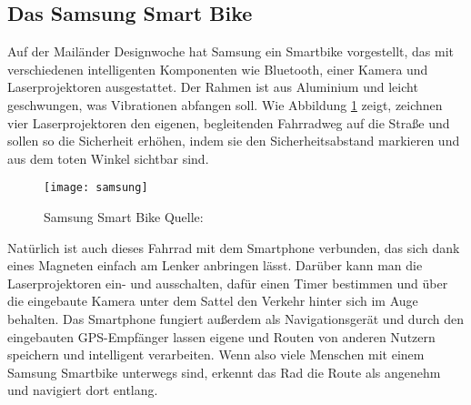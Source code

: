 \subsection{Das Samsung Smart Bike}
Auf der Mailänder Designwoche hat Samsung ein Smartbike vorgestellt, das mit verschiedenen intelligenten Komponenten wie Bluetooth, einer Kamera und Laserprojektoren ausgestattet. Der Rahmen ist aus Aluminium und leicht geschwungen, was Vibrationen abfangen soll. Wie Abbildung \ref{fig:samsung} zeigt, zeichnen vier Laserprojektoren den eigenen, begleitenden Fahrradweg auf die Straße und sollen so die Sicherheit erhöhen, indem sie den Sicherheitsabstand markieren und aus dem toten Winkel sichtbar sind. 
\begin{figure}[H]
    \centering
    \texttt{[image: samsung]}
    \caption[Samsung Smart Bike]{Samsung Smart Bike  Quelle: \cite{smartbike}} 
    \label{fig:samsung}
\end{figure}
Natürlich ist auch dieses Fahrrad mit dem \gls{Smartphone} verbunden, das sich dank eines Magneten einfach am Lenker anbringen lässt. Darüber kann man die Laserprojektoren ein- und ausschalten, dafür einen Timer bestimmen und über die eingebaute Kamera unter dem Sattel den Verkehr hinter sich im Auge behalten. Das \gls{Smartphone} fungiert außerdem als Navigationsgerät und durch den eingebauten \gls{GPS}-Empfänger lassen eigene und Routen von anderen Nutzern speichern und intelligent verarbeiten\cite{smartbike}. Wenn also viele Menschen mit einem Samsung Smartbike unterwegs sind, erkennt das Rad die Route als angenehm und navigiert dort entlang. 
